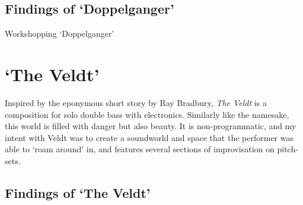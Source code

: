 \subsection{Findings of `Doppelganger'}
Workshopping `Doppelganger' \lipsum[3]

\section{`The Veldt'}
Inspired by the eponymous short story by Ray Bradbury, \textit{The Veldt} is a composition for solo double bass with electronics. Similarly like the namesake, this world is filled with danger but also beauty. It is non-programmatic, and my intent with Veldt was to create a soundworld and space that the performer was able to `roam around' in, and features several sections of improvisation on pitch-sets. \lipsum[1]

\subsection{Findings of `The Veldt'}
\lipsum[3]

